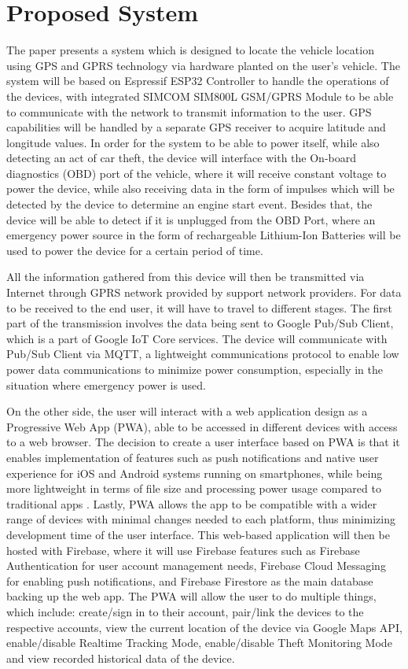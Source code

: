 \documentclass[conference]{IEEEtran}
\begin{document}
\section{Proposed System}
The paper presents a system which is designed to locate the vehicle location using GPS and GPRS technology via hardware planted on the user's vehicle. The system will be based on Espressif ESP32 Controller to handle the operations of the devices, 
with integrated SIMCOM SIM800L GSM/GPRS Module to be able to communicate with the network to transmit information to the user. GPS capabilities will be handled by a separate GPS receiver to acquire latitude and 
longitude values. In order for the system to be able to power itself, while also detecting an act of car theft, the device will interface with the On-board diagnostics (OBD) port of the vehicle, where it will 
receive constant voltage to power the device, while also receiving data in the form of impulses which will be detected by the device to determine an engine start event. Besides that, the device will be able to detect if it is unplugged from the 
OBD Port, where an emergency power source in the form of rechargeable Lithium-Ion Batteries will be used to power the device for a certain period of time. 

All the information gathered from this device will then be transmitted via Internet through GPRS network provided by support network providers. For data to be received to the end user, it will have to travel to different stages. The first 
part of the transmission involves the data being sent to Google Pub/Sub Client, which is a part of Google IoT Core services. The device will communicate with Pub/Sub Client via MQTT, a lightweight communications protocol to enable low power data communications 
to minimize power consumption, especially in the situation where emergency power is used. 

On the other side, the user will interact with a web application design as a Progressive Web App (PWA), able to be accessed in different devices with access to a web browser. 
The decision to create a user interface based on PWA is that it enables implementation of features such as push notifications and native user experience for iOS and Android systems running on smartphones, 
while being more lightweight in terms of file size and processing power usage compared to traditional apps \cite{8456349}. Lastly, PWA allows the app to be compatible with a wider range of devices with minimal changes needed to 
each platform, thus minimizing development time of the user interface. This web-based application will then be hosted with Firebase, where it will use Firebase features such as Firebase Authentication for user account management needs, 
Firebase Cloud Messaging for enabling push notifications, and Firebase Firestore as the main database backing up the web app. The PWA will allow the user to do multiple things, which include: create/sign in to their account, pair/link the devices to the respective accounts, view the current location of the device via Google Maps API, enable/disable Realtime Tracking Mode, enable/disable Theft Monitoring Mode and view recorded historical data of the device. 
\end{document}
